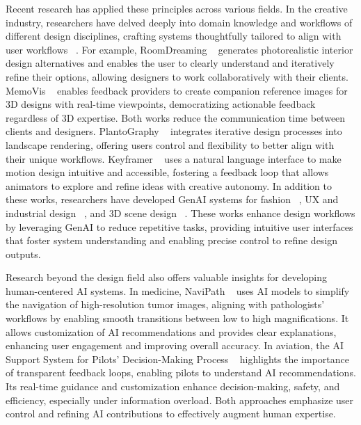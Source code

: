 Recent research has applied these principles across various fields. In the creative industry, researchers have delved deeply into domain knowledge and workflows of different design disciplines, crafting systems thoughtfully tailored to align with user workflows ~\cite{Anantrasirichai2020Artificial, Knearem2023Exploring, Mccormack2020Design}. For example, 
RoomDreaming ~\cite{wang2024roomdreaming} generates photorealistic interior design alternatives and enables the user to clearly understand and iteratively refine their options, allowing designers to work collaboratively with their clients. 
MemoVis ~\cite{rw20} enables feedback providers to create companion reference images for 3D designs with real-time viewpoints, democratizing actionable feedback regardless of 3D expertise. Both works reduce the communication time between clients and designers.
PlantoGraphy ~\cite{PlantoGraphy2024} integrates iterative design processes into landscape rendering, offering users control and flexibility to better align with their unique workflows. 
Keyframer ~\cite{Tseng2024KeyframerEA} uses a natural language interface to make motion design intuitive and accessible, fostering a feedback loop that allows animators to explore and refine ideas with creative autonomy. 
In addition to these works, researchers have developed GenAI systems for fashion ~\cite{rw29}, UX and industrial design ~\cite{claytoplay2024}, and 3D scene design ~\cite{oh2024lumimood}. 
These works enhance design workflows by leveraging GenAI to reduce repetitive tasks, providing intuitive user interfaces that foster system understanding and enabling precise control to refine design outputs.

Research beyond the design field also offers valuable insights for developing human-centered AI systems. In medicine, NaviPath ~\cite{navipath2023} uses AI models to simplify the navigation of high-resolution tumor images, aligning with pathologists' workflows by enabling smooth transitions between low to high magnifications. It allows customization of AI recommendations and provides clear explanations, enhancing user engagement and improving overall accuracy. 
In aviation, the AI Support System for Pilots’ Decision-Making Process ~\cite{pilot} highlights the importance of transparent feedback loops, enabling pilots to understand AI recommendations. Its real-time guidance and customization enhance decision-making, safety, and efficiency, especially under information overload. Both approaches emphasize user control and refining AI contributions to effectively augment human expertise.

